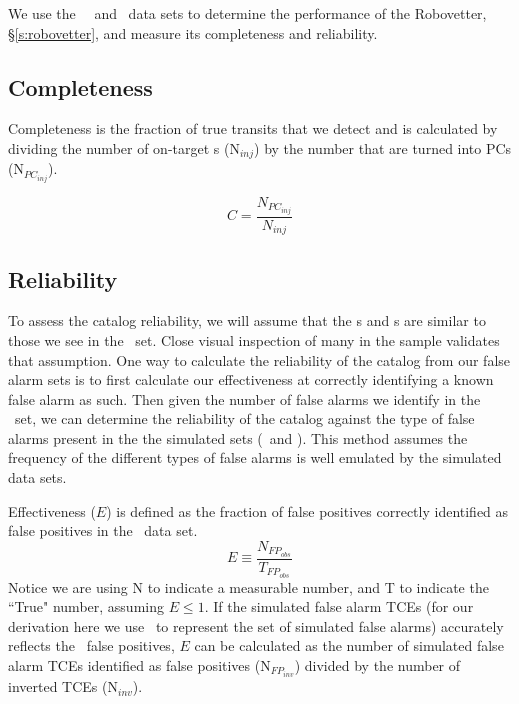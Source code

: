 

\newcommand{\opsfp}{N$_{FP_{obs}}$}
\newcommand{\opspc}{N$_{PC_{obs}}$}
\newcommand{\opsN}{N$_{obs}$}
\newcommand{\trueopspc}{T$_{PC_{obs}}$}
\newcommand{\missedfp}{T$_{FP_{obs}}$ - N$_{FP_{obs}}$}
\newcommand{\invfp}{N$_{FP_{inv}}$}
\newcommand{\invpc}{N$_{PC_{inv}}$}
\newcommand{\invN}{N$_{inv}$}
\newcommand{\sfatce}{SFA-TCE}


We use the \injtce\, \scrtce\ and \invtce\ data sets to determine the performance of the Robovetter, \S\ref{s:robovetter}, and measure its completeness and reliability.

\subsection{Completeness}
Completeness is the fraction of true transits that we detect and is calculated by dividing the number of on-target \injtce s (N$_{inj}$) by the number that are turned into PCs (N$_{PC_{inj}}$). 

\begin{equation}
\label{comp}
C = \frac{N_{PC_{inj}}}{N_{inj}}
\end{equation}



\subsection{Reliability}
\label{s:relcalc}
To assess the catalog reliability, we will assume that the \scrtce s and \invtce s are similar to those we see in the \opstce\ set. Close visual inspection of many in the sample validates that assumption.  One way to calculate the reliability of the catalog from our false alarm sets is to first calculate our effectiveness at correctly identifying a known false alarm as such.  Then given the number of false alarms we identify in the \opstce\ set, we can determine the reliability of the catalog against the type of false alarms present in the the simulated sets (\invtce\ and \scrtce). This method assumes the frequency of the different types of false alarms is well emulated by the simulated data sets. 


Effectiveness ($E$) is defined as the fraction of false positives correctly identified as false positives in the \opstce\ data set. 
\begin{equation}
\label{effect1}
E \equiv \frac{N_{FP_{obs}}}{T_{FP_{obs}}}
\end{equation}
Notice we are using N to indicate a measurable number, and T to indicate the ``True" number, assuming $E\leq 1 $.  If the simulated false alarm TCEs (for our derivation here we use \invtce\ to represent the set of simulated false alarms) accurately reflects the \opstce\ false positives, $E$ can be calculated as the number of simulated false alarm TCEs identified as false positives (\invfp) divided by the number of inverted TCEs (\invN). 

